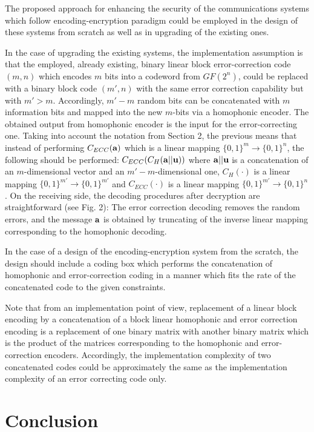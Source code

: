 \documentclass{article}[11pt]
\begin{document}
The proposed approach for enhancing the security of the
communications systems which follow encoding-encryption paradigm
could be employed in the design of these systems from scratch as
well as in upgrading of the existing ones.

In the case of upgrading the existing systems, the implementation
assumption is that the employed, already existing, binary linear
block error-correction code $(m,n)$ which encodes $m$ bits into a
codeword from $GF(2^n)$, could be replaced with a binary block
code $(m',n)$ with the same error correction capability but with
$m' > m$. Accordingly, $m'-m$ random bits can be concatenated with
$m$ information bits and mapped into the new $m$-bits via a
homophonic encoder. The obtained output from homophonic encoder is
the input for the error-correcting one. Taking into account the
notation from Section 2, the previous means that instead of
performing $C_{ECC}({\bf a})$ which is a linear mapping
$\{0,1\}^{m} \rightarrow \{0,1\}^{n}$, the following should be
performed: $C_{ECC}(C_H({\bf a} || {\bf u}))$ where ${\bf a} ||
{\bf u}$ is a concatenation of an $m$-dimensional vector and an
$m'-m$-dimensional one, $C_H(\cdot)$ is a linear mapping
$\{0,1\}^{m'} \rightarrow \{0,1\}^{m'}$ and $C_{ECC}(\cdot)$ is a
linear mapping $\{0,1\}^{m'} \rightarrow \{0,1\}^{n}$. On the
receiving side, the decoding procedures after decryption are
straightforward (see Fig. 2): The error correction decoding
removes the random errors, and the message ${\bf a}$ is obtained
by truncating of the inverse linear mapping corresponding to the
homophonic decoding.

In the case of a design of the encoding-encryption system from
the scratch, the design should include a coding box which performs
the concatenation of homophonic and error-correction coding in a
manner which fits the rate of the concatenated code to the given
constraints.

Note that from an implementation point of view, replacement of a
linear block encoding by a concatenation of a block linear
homophonic and error correction encoding is a replacement of one
binary matrix with another binary matrix which is the product of
the matrices corresponding to the homophonic and error-correction
encoders. Accordingly, the implementation complexity of two
concatenated codes could be approximately the same as the
implementation complexity of an error correcting code only.



\section{Conclusion}
\label{sec:conclusion}
\end{document}
